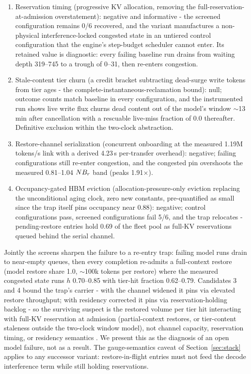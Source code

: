 \begin{enumerate}
\item Reservation timing (progressive KV allocation, removing the
   full-reservation-at-admission overstatement): negative and
   informative - the screened configuration remains 0/6 recovered,
   and the variant manufactures a non-physical interference-locked
   congested state in an untiered control configuration that the
   engine's step-budget scheduler cannot enter. Its retained value
   is diagnostic: every failing baseline run drains from waiting
   depth 319--745 to a trough of 0--31, then re-enters congestion.
\item Stale-content tier churn (a credit bracket subtracting dead-surge
   write tokens from tier ages - the complete-instantaneous-reclamation
   bound): null; outcome counts match baseline in every
   configuration, and the instrumented run shows live write flux
   churns dead content out of the model's window $\sim$13\,min after
   cancellation with a rescuable live-miss fraction of 0.0
   thereafter. Definitive exclusion within the two-clock
   abstraction.
\item Restore-channel serialization (concurrent onboarding at the
   measured 1.19M tokens/s link with a derived 4.23\,s per-transfer
   overhead): negative; failing configurations still re-enter
   congestion, and the congested pin overshoots the measured
   0.81--1.04 $N B_r$ band (peaks 1.91$\times$).
\item Occupancy-gated HBM eviction (allocation-pressure-only eviction
   replacing the unconditional aging clock, zero new constants,
   pre-quantified as small since the trap itself pins occupancy near
   0.88): negative; control configurations pass, screened
   configurations fail 5/6, and the trap relocates - pending-restore
   entries hold 0.69 of the fleet pool as full-KV reservations
   queued behind the serial channel.
\end{enumerate}

Jointly the screens sharpen the failure to a re-entry trap: failing
model runs drain to near-empty queues, then every completion
re-admits a full-context restore (model restore share 1.0, $\sim$100k
tokens per restore) where the measured congested state runs
$h$ 0.70--0.85 with tier-hit fraction 0.62--0.79. Candidates 3 and 4
bound the trap's carrier - with the channel widened it pins via
elevated restore throughput; with residency corrected it pins via
reservation-holding backlog - so the surviving suspect is the
restored volume per tier hit interacting with full-KV reservation at
admission (partial-context restores, or tier-content staleness
outside the two-clock window model), not channel capacity,
reservation timing, or residency semantics . We present this as
the diagnosis of an open model failure, not as a result. The
gauge-semantics caveat of Section~\ref{sec:stack} applies to any successor
variant: restore-in-flight entries must not feed the decode
interference term while still holding reservations.
